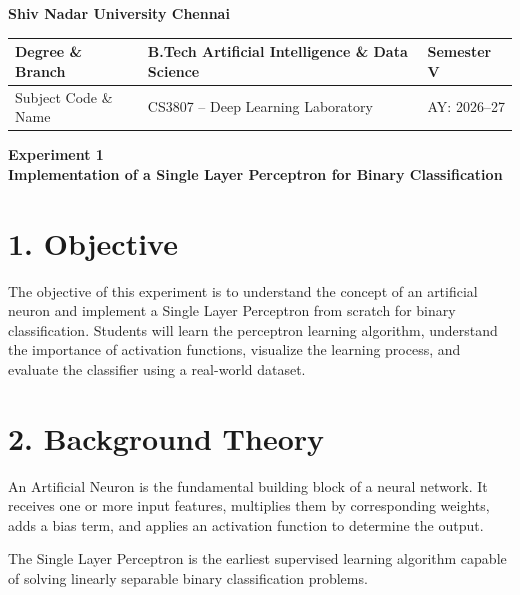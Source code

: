 \documentclass[11pt]{article}
\begin{document}
\begin{center}
\Large\textbf{Shiv Nadar University Chennai}\\[2mm]
\end{center}

\renewcommand{\arraystretch}{1.4}

\begin{tabular}{|p{3.5cm}|p{8cm}|p{2cm}|}
\hline
Degree \& Branch & B.Tech Artificial Intelligence \& Data Science & Semester V\\ \hline
Subject Code \& Name & CS3807 -- Deep Learning Laboratory & AY: 2026--27\\ \hline
\end{tabular}

\vspace{3mm}

\begin{center}
\Large\textbf{Experiment 1}\\
\large\textbf{Implementation of a Single Layer Perceptron for Binary Classification}
\end{center}


\section*{1. Objective}

The objective of this experiment is to understand the concept of an artificial neuron and implement a Single Layer Perceptron from scratch for binary classification. Students will learn the perceptron learning algorithm, understand the importance of activation functions, visualize the learning process, and evaluate the classifier using a real-world dataset.


\section*{2. Background Theory}

An Artificial Neuron is the fundamental building block of a neural network. It receives one or more input features, multiplies them by corresponding weights, adds a bias term, and applies an activation function to determine the output.

The Single Layer Perceptron is the earliest supervised learning algorithm capable of solving linearly separable binary classification problems.
\end{document}
